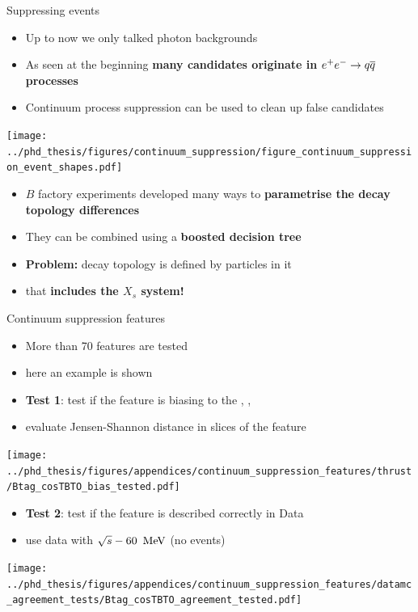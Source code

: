 \documentclass[xcolor=dvipsnames]{beamer}
\begin{document}
\begin{frame}{Suppressing \qqbar events}
   \centering\scriptsize
   \begin{itemize}
      \item Up to now we only talked photon backgrounds
      \item As seen at the beginning \textbf{many candidates originate in} {\boldmath$e^+e^-\rightarrow q\overline q$} \textbf{processes}
      \item[\ra] Continuum process suppression can be used to clean up false \g candidates
   \end{itemize}

   \texttt{[image: ../phd\_thesis/figures/continuum\_suppression/figure\_continuum\_suppression\_event\_shapes.pdf]}

\begin{itemize}
\item $B$ factory experiments developed many ways to \textbf{parametrise the decay topology differences}
\item They can be combined using a \textbf{boosted decision tree}
\item \textbf{Problem:} decay topology is defined by particles in it 
\item[\ra] that \textbf{includes the $X_s$ system!}
\end{itemize}

\end{frame}

\begin{frame}{Continuum suppression features}

   \scriptsize\centering

   \begin{itemize}
      \item More than 70 features are tested
      \item[\ra] here an example is shown
   \end{itemize}

   \begin{itemize}
      \item \textbf{Test 1}: test if the feature is biasing to the \EB, \Estar, \Mbc  
      \item[\ra] evaluate Jensen-Shannon distance in slices of the feature
   \end{itemize}

   \texttt{[image: ../phd\_thesis/figures/appendices/continuum\_suppression\_features/thrust/Btag\_cosTBTO\_bias\_tested.pdf]}


   \begin{itemize}
      \item \textbf{Test 2}: test if the feature is described correctly in Data
      \item[\ra] use data with $\sqrt{s}-60~\mathrm{\,Me\kern -0.1em V}$ (no \FourS events)
   \end{itemize}



   \texttt{[image: ../phd\_thesis/figures/appendices/continuum\_suppression\_features/datamc\_agreement\_tests/Btag\_cosTBTO\_agreement\_tested.pdf]}

\end{frame}
\end{document}
